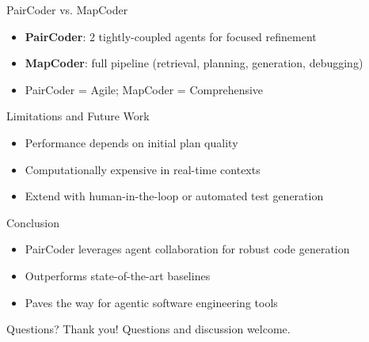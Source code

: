 \documentclass{beamer}
\begin{document}
\begin{frame}{PairCoder vs. MapCoder}
\begin{itemize}
  \item \textbf{PairCoder}: 2 tightly-coupled agents for focused refinement
  \item \textbf{MapCoder}: full pipeline (retrieval, planning, generation, debugging)
  \item PairCoder = Agile; MapCoder = Comprehensive
\end{itemize}
\end{frame}

\begin{frame}{Limitations and Future Work}
\begin{itemize}
  \item Performance depends on initial plan quality
  \item Computationally expensive in real-time contexts
  \item Extend with human-in-the-loop or automated test generation
\end{itemize}
\end{frame}

\begin{frame}{Conclusion}
\begin{itemize}
  \item PairCoder leverages agent collaboration for robust code generation
  \item Outperforms state-of-the-art baselines
  \item Paves the way for agentic software engineering tools
\end{itemize}
\end{frame}

\begin{frame}{Questions?}
\centering
\Large Thank you!\newline
Questions and discussion welcome.
\end{frame}
\end{document}
